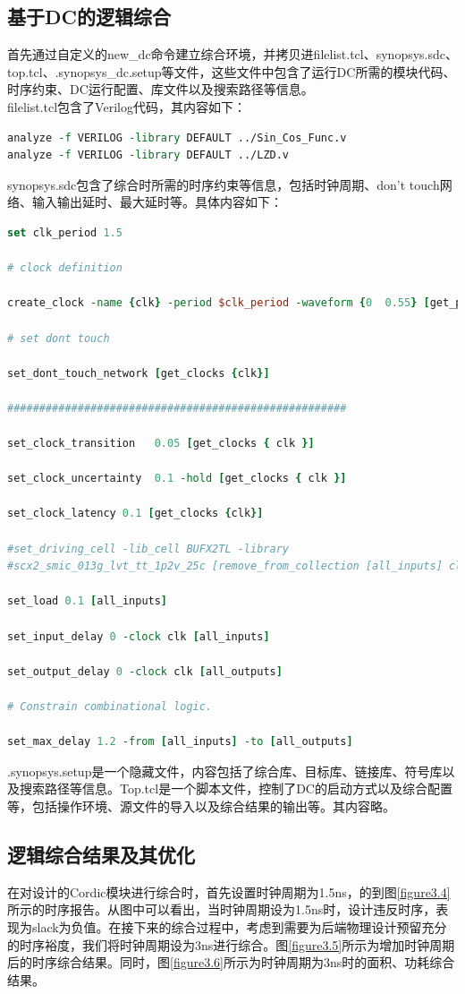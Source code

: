 \documentclass[a4paper,12pt]{report}
\begin{document}
\subsection{基于DC的逻辑综合}
首先通过自定义的new\_dc命令建立综合环境，并拷贝进filelist.tcl、synopsys.sdc、top.tcl、.synopsys\_dc.setup等文件，这些文件中包含了运行DC所需的模块代码、时序约束、DC运行配置、库文件以及搜索路径等信息。\\
\indent filelist.tcl包含了Verilog代码，其内容如下：
{
\footnotesize
\begin{lstlisting}[language=tcl]
analyze -f VERILOG -library DEFAULT ../Sin_Cos_Func.v
analyze -f VERILOG -library DEFAULT ../LZD.v
\end{lstlisting}
}
synopsys.sdc包含了综合时所需的时序约束等信息，包括时钟周期、don't touch网络、输入输出延时、最大延时等。具体内容如下：
{
\footnotesize
\begin{lstlisting}[language=tcl]
set clk_period 1.5

# clock definition

create_clock -name {clk} -period $clk_period -waveform {0  0.55} [get_ports {clk}]     

# set dont touch

set_dont_touch_network [get_clocks {clk}]

#####################################################

set_clock_transition   0.05 [get_clocks { clk }]

set_clock_uncertainty  0.1 -hold [get_clocks { clk }]

set_clock_latency 0.1 [get_clocks {clk}]

#set_driving_cell -lib_cell BUFX2TL -library 
#scx2_smic_013g_lvt_tt_1p2v_25c [remove_from_collection [all_inputs] clk reset]

set_load 0.1 [all_inputs]

set_input_delay 0 -clock clk [all_inputs]

set_output_delay 0 -clock clk [all_outputs]

# Constrain combinational logic.

set_max_delay 1.2 -from [all_inputs] -to [all_outputs]
\end{lstlisting}
}
.synopsys.setup是一个隐藏文件，内容包括了综合库、目标库、链接库、符号库以及搜索路径等信息。Top.tcl是一个脚本文件，控制了DC的启动方式以及综合配置等，包括操作环境、源文件的导入以及综合结果的输出等。其内容略。

\subsection{逻辑综合结果及其优化}
在对设计的Cordic模块进行综合时，首先设置时钟周期为1.5ns，的到图\ref{figure3.4}所示的时序报告。从图中可以看出，当时钟周期设为1.5ns时，设计违反时序，表现为slack为负值。在接下来的综合过程中，考虑到需要为后端物理设计预留充分的时序裕度，我们将时钟周期设为3ns进行综合。图\ref{figure3.5}所示为增加时钟周期后的时序综合结果。同时，图\ref{figure3.6}所示为时钟周期为3ns时的面积、功耗综合结果。
\end{document}
